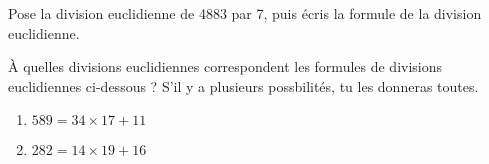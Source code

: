 \begin{myenumerate}
	\item Pose la division euclidienne de 4883 par 7, puis écris la formule de la division euclidienne.
	\item \`A quelles divisions euclidiennes correspondent les formules de divisions euclidiennes ci-dessous ? S'il y a plusieurs possbilités, tu les donneras toutes.
	\begin{enumerate}
		\item $589=34\times17+11$
		\item $282=14\times19+16$
	\end{enumerate}
\end{myenumerate}